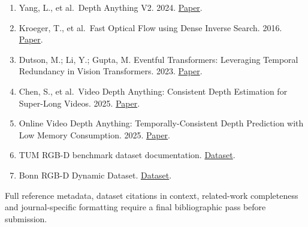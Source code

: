\documentclass[
  10pt,
]{article}
\providecommand{\tightlist}{%
  \setlength{\itemsep}{0pt}\setlength{\parskip}{0pt}}
\begin{document}
\begin{enumerate}
\def\labelenumi{\arabic{enumi}.}
\tightlist
\item
  Yang, L., et al.~Depth Anything V2. 2024.
  \href{https://arxiv.org/abs/2406.09414}{Paper}.
\item
  Kroeger, T., et al.~Fast Optical Flow using Dense Inverse Search.
  2016. \href{https://arxiv.org/abs/1603.03590}{Paper}.
\item
  Dutson, M.; Li, Y.; Gupta, M. Eventful Transformers: Leveraging
  Temporal Redundancy in Vision Transformers. 2023.
  \href{https://arxiv.org/abs/2308.13494}{Paper}.
\item
  Chen, S., et al.~Video Depth Anything: Consistent Depth Estimation for
  Super-Long Videos. 2025.
  \href{https://arxiv.org/abs/2501.12375}{Paper}.
\item
  Online Video Depth Anything: Temporally-Consistent Depth Prediction
  with Low Memory Consumption. 2025.
  \href{https://arxiv.org/abs/2510.09182}{Paper}.
\item
  TUM RGB-D benchmark dataset documentation.
  \href{https://cvg.cit.tum.de/data/datasets/rgbd-dataset}{Dataset}.
\item
  Bonn RGB-D Dynamic Dataset.
  \href{https://www.ipb.uni-bonn.de/data/rgbd-dynamic-dataset/}{Dataset}.
\end{enumerate}

Full reference metadata, dataset citations in context, related-work
completeness and journal-specific formatting require a final
bibliographic pass before submission.
\end{document}
